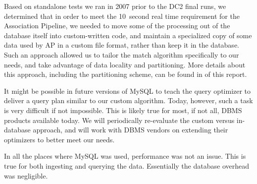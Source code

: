 Based on standalone tests we ran in 2007 prior to the DC2
final runs, we determined that in order to meet the 10~second
real time requirement for the Association Pipeline, we needed to
move some of the processing out of the database itself into custom-written
code, and maintain a specialized copy of some data used by AP 
in a custom file format, rather than keep it in the database. 
Such an approach allowed us to tailor the match algorithm specifically 
to our needs, and take advantage of data locality and partitioning. 
More details about this approach, including the partitioning scheme, can 
be found in  of this report.

It might be possible in future versions of MySQL to teach the
query optimizer to deliver a query plan similar to our custom 
algorithm.  Today, however, such a task is very difficult if not impossible. 
This is likely true for most, if not all, DBMS products available 
today. We will periodically re-evaluate the custom versus in-database 
approach, and will work with DBMS vendors on extending their 
optimizers to better meet our needs.

In all the places where MySQL was used, performance was not 
an issue. This is true for both ingesting and querying the data.
Essentially the database overhead was negligible. 
